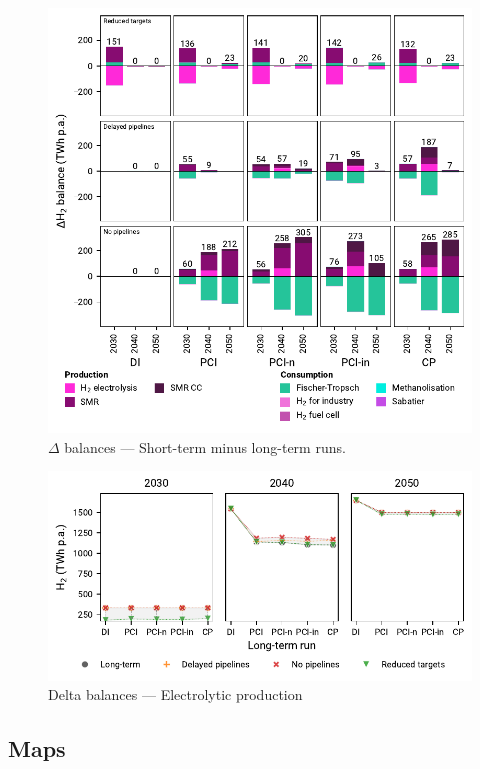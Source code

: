 \documentclass[preprint,12pt,sort&compress]{elsarticle}
\begin{document}
\begin{figure}[htbp]
  \centering
  \includegraphics[width=\textwidth]{balances_overview_extended_H2}
  \caption{$\Delta$ balances --- Short-term minus long-term runs.}
  \label{fig:balances_overview_extended_H2_stored}
\end{figure}

\begin{figure}[htbp]
  \centering
  \includegraphics[width=\textwidth]{delta_balances_H2 Electrolysis}
  \caption{Delta balances --- Electrolytic  production}
  \label{fig:delta_balances_h2_electrolysis}
\end{figure}


\clearpage
\subsection{Maps}
\label{sec:maps}
\end{document}
